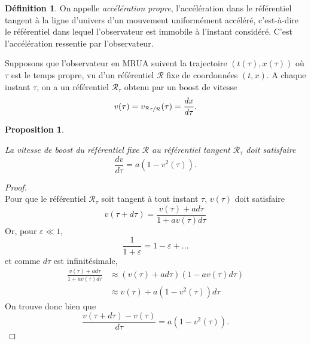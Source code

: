 \documentclass[a4paper,11pt]{report}
\theoremstyle{definition}
\theoremstyle{plain}
\newtheorem{prop}[thm]{Proposition}
\theoremstyle{definition}
\newtheorem{defn}{Définition}[chapter]
\theoremstyle{remark}
\newcommand{\R}{\mathcal{R}}
\begin{document}
            \begin{defn}
                On appelle \textit{accélération propre}, l'accélération dans le référentiel tangent à la ligne d'univers d'un mouvement uniformément accéléré, c'est-à-dire le référentiel dans lequel l'observateur est immobile à l'instant considéré. C'est l'accélération ressentie par l'observateur.
            \end{defn}
            
            Supposons que l'observateur en MRUA suivent la trajectoire $(t(\tau),x(\tau))$ où $\tau$ est le temps propre, vu d'un référentiel $\mathcal{R}$ fixe de coordonnées $(t,x)$. A chaque instant $\tau$, on a un référentiel $\mathcal{R}_{\tau}$ obtenu par un boost de vitesse
            \begin{equation}
                v(\tau) = v_{\nicefrac{\R_\tau}{\R}}(\tau) = \frac{dx}{d\tau}.
            \end{equation}
            
            \begin{prop}\begin{leftbar}\label{prop:v}
                La vitesse de boost du référentiel fixe $\R$ au référentiel tangent $\R_\tau$ doit satisfaire
                \begin{equation}
                    \frac{dv}{d\tau} = a\left(1-v^2(\tau)\right).
                \end{equation}
            \end{leftbar}\end{prop}
            
            \begin{proof}
            ${}$\\
                Pour que le référentiel $\R_\tau$ soit tangent à tout instant $\tau$, $v(\tau)$ doit satisfaire
            \begin{equation}
                v(\tau+d\tau) = \frac{v(\tau)+ad\tau}{1+av(\tau)d\tau}
            \end{equation}
            Or, pour $\varepsilon\ll 1$,
            \begin{equation}
                \frac{1}{1+\varepsilon} = 1-\varepsilon+\dots
            \end{equation}
            et comme $d\tau$ est infinitésimale,
            \begin{align}
                \frac{v(\tau)+ad\tau}{1+av(\tau)d\tau} &\approx \left(v(\tau)+ad\tau\right)\left( 1-av(\tau)d\tau \right) \\
                &\approx v(\tau) + a\left( 1-v^2(\tau) \right)d\tau
            \end{align}
            On trouve donc bien que 
            \begin{equation}
                \frac{v(\tau+d\tau)-v(\tau)}{d\tau} = a\left( 1-v^2(\tau) \right).
            \end{equation}
            \end{proof}
            
\end{document}
